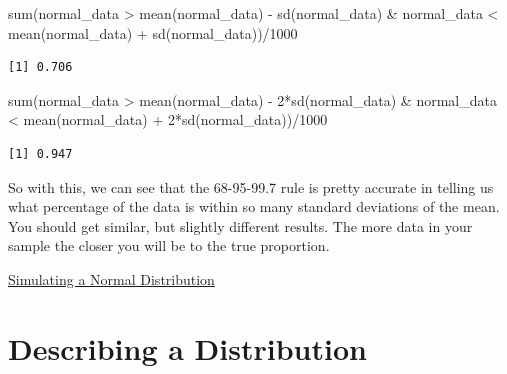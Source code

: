 \documentclass[
  letterpaper,
  DIV=11,
  numbers=noendperiod]{scrreprt}
\newenvironment{Shaded}{\begin{snugshade}}{\end{snugshade}}
\newcommand{\DecValTok}[1]{\textcolor[rgb]{0.68,0.00,0.00}{#1}}
\newcommand{\FunctionTok}[1]{\textcolor[rgb]{0.28,0.35,0.67}{#1}}
\newcommand{\NormalTok}[1]{\textcolor[rgb]{0.00,0.23,0.31}{#1}}
\newcommand{\SpecialCharTok}[1]{\textcolor[rgb]{0.37,0.37,0.37}{#1}}
\begin{document}
\begin{Shaded}
\begin{Highlighting}[]
\FunctionTok{sum}\NormalTok{(normal\_data }\SpecialCharTok{\textgreater{}} \FunctionTok{mean}\NormalTok{(normal\_data) }\SpecialCharTok{{-}} \FunctionTok{sd}\NormalTok{(normal\_data) }\SpecialCharTok{\&} 
\NormalTok{      normal\_data }\SpecialCharTok{\textless{}} \FunctionTok{mean}\NormalTok{(normal\_data) }\SpecialCharTok{+} \FunctionTok{sd}\NormalTok{(normal\_data))}\SpecialCharTok{/}\DecValTok{1000}
\end{Highlighting}
\end{Shaded}

\begin{verbatim}
[1] 0.706
\end{verbatim}

\begin{Shaded}
\begin{Highlighting}[]
\FunctionTok{sum}\NormalTok{(normal\_data }\SpecialCharTok{\textgreater{}} \FunctionTok{mean}\NormalTok{(normal\_data) }\SpecialCharTok{{-}} \DecValTok{2}\SpecialCharTok{*}\FunctionTok{sd}\NormalTok{(normal\_data) }\SpecialCharTok{\&} 
\NormalTok{      normal\_data }\SpecialCharTok{\textless{}} \FunctionTok{mean}\NormalTok{(normal\_data) }\SpecialCharTok{+} \DecValTok{2}\SpecialCharTok{*}\FunctionTok{sd}\NormalTok{(normal\_data))}\SpecialCharTok{/}\DecValTok{1000}
\end{Highlighting}
\end{Shaded}

\begin{verbatim}
[1] 0.947
\end{verbatim}

So with this, we can see that the 68-95-99.7 rule is pretty accurate in
telling us what percentage of the data is within so many standard
deviations of the mean. You should get similar, but slightly different
results. The more data in your sample the closer you will be to the true
proportion.

\begin{watch}{}{}
    \href{https://youtu.be/0C7qVM9wr3c}{Simulating a Normal Distribution}
\end{watch}


\chapter{Describing a Distribution}\label{describing-a-distribution}
\end{document}
